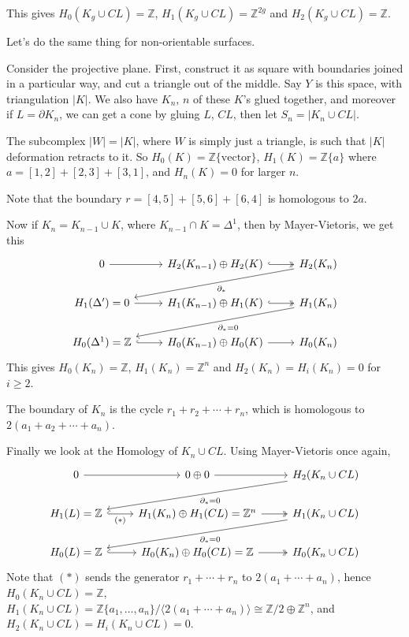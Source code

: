 \documentclass[12pt]{article}
\begin{document}
This gives $H_0(K_g \cup CL) = \mathbb{Z}$, $H_1(K_g \cup CL) = \mathbb{Z}^{2g}$ and $H_2(K_g \cup CL) = \mathbb{Z}$.


Let's do the same thing for non-orientable surfaces.

\begin{exbox}
	Consider the projective plane. First, construct it as square with boundaries joined in a particular way, and cut a triangle out of the middle. Say $Y$ is this space, with triangulation $|K|$. We also have $K_n$, $n$ of these $K$'s glued together, and moreover if $L = \partial K_n$, we can get a cone by gluing $L$, $CL$, then let $S_n = |K_n \cup CL|$.

	The subcomplex $|W| = |K|$, where $W$ is simply just a triangle, is such that $|K|$ deformation retracts to it. So $H_0(K) = \mathbb{Z}\{\text{vector}\}$, $H_1(K) = \mathbb{Z}\{a\}$ where $a = [1, 2] + [2, 3] + [3, 1]$, and $H_n(K) = 0$ for larger $n$.

	Note that the boundary $r = [4, 5] + [5, 6] + [6, 4]$ is homologous to $2a$.

	Now if $K_n = K_{n-1} \cup K$, where $K_{n-1} \cap K = \Delta^1$, then by Mayer-Vietoris, we get this
\begin{equation*}
	\begin{tikzcd}
		0 \arrow[r] & H_2(K_{n-1}) \oplus H_2(K) \arrow[r, hook, two heads] & H_2(K_n) \arrow[dll, "\partial_\ast"] \\
 	H_1(\Delta') = 0 \arrow[r] & H_1(K_{n-1}) \oplus H_1(K) \arrow[r, hook, two heads] & H_1(K_n) \arrow[dll, "\partial_\ast = 0"] \\
 H_0(\Delta^1) = \mathbb{Z} \arrow[r, hook] & H_0(K_{n-1}) \oplus H_0(K) \arrow[r] & H_0(K_n)
	\end{tikzcd}
\end{equation*}
	This gives $H_0(K_n) = \mathbb{Z}$, $H_1(K_n) = \mathbb{Z}^n$ and $H_2(K_n) = H_i(K_n) = 0$ for $i \geq 2$.

	The boundary of $K_n$ is the cycle $r_1 + r_2 + \cdots + r_n$, which is homologous to $2(a_1 + a_2 + \cdots + a_n)$.

	Finally we look at the Homology of $K_n \cup CL$. Using Mayer-Vietoris once again,
\begin{equation*}
	\begin{tikzcd}
		0 \arrow[r] & 0 \oplus 0 \arrow[r] & H_2(K_n \cup CL) \arrow[dll, "\partial_\ast = 0"] \\
 	H_1(L) = \mathbb{Z}\arrow[r, "(\ast)"', hook] & H_1(K_n) \oplus H_1(CL) = \mathbb{Z}^{n} \arrow[r, two heads] & H_1(K_n \cup CL) \arrow[dll, "\partial_\ast = 0"] \\
 H_0(L) = \mathbb{Z}\arrow[r, hook] & H_0(K_n) \oplus H_0(CL) = \mathbb{Z} \arrow[r, two heads] & H_0(K_n \cup CL)
	\end{tikzcd}
\end{equation*}
Note that $(\ast)$ sends the generator $r_1 + \cdots + r_n$ to $2(a_1 + \cdots + a_n)$, hence $H_0(K_n \cup CL) = \mathbb{Z}$, $H_1(K_n \cup CL) = \mathbb{Z}\{a_1, \ldots, a_n\} / \langle 2(a_1 + \cdots + a_n) \rangle \cong \mathbb{Z}/2 \oplus \mathbb{Z}^n$, and $H_2(K_n \cup CL) = H_i(K_n \cup CL) = 0$.
\end{exbox}
\end{document}
